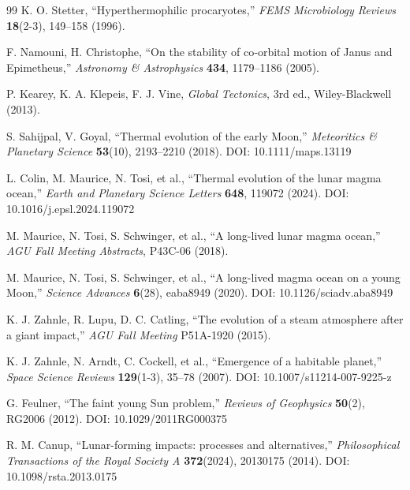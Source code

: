 \documentclass[12pt,a4paper]{article}
\begin{document}
\begin{thebibliography}{99}
		K. O. Stetter, ``Hyperthermophilic procaryotes,''
		\emph{FEMS Microbiology Reviews} \textbf{18}(2-3), 149–158 (1996).
		
		F. Namouni, H. Christophe, ``On the stability of co‑orbital motion of Janus and Epimetheus,''
		\emph{Astronomy \& Astrophysics} \textbf{434}, 1179–1186 (2005).
		
		P. Kearey, K. A. Klepeis, F. J. Vine, \emph{Global Tectonics}, 3rd ed., Wiley-Blackwell (2013).
		
		S. Sahijpal, V. Goyal, ``Thermal evolution of the early Moon,''
		\emph{Meteoritics \& Planetary Science} \textbf{53}(10), 2193–2210 (2018). DOI: 10.1111/maps.13119
		
		L. Colin, M. Maurice, N. Tosi, et al., ``Thermal evolution of the lunar magma ocean,''
		\emph{Earth and Planetary Science Letters} \textbf{648}, 119072 (2024). DOI: 10.1016/j.epsl.2024.119072
		
		M. Maurice, N. Tosi, S. Schwinger, et al., ``A long-lived lunar magma ocean,''
		\emph{AGU Fall Meeting Abstracts}, P43C-06 (2018).
		
		M. Maurice, N. Tosi, S. Schwinger, et al., ``A long-lived magma ocean on a young Moon,''
		\emph{Science Advances} \textbf{6}(28), eaba8949 (2020). DOI: 10.1126/sciadv.aba8949
		
		K. J. Zahnle, R. Lupu, D. C. Catling, ``The evolution of a steam atmosphere after a giant impact,''
		\emph{AGU Fall Meeting} P51A-1920 (2015).
		
		K. J. Zahnle, N. Arndt, C. Cockell, et al., ``Emergence of a habitable planet,''
		\emph{Space Science Reviews} \textbf{129}(1-3), 35–78 (2007). DOI: 10.1007/s11214-007-9225-z
		
		G. Feulner, ``The faint young Sun problem,''
		\emph{Reviews of Geophysics} \textbf{50}(2), RG2006 (2012). DOI: 10.1029/2011RG000375
		
		R. M. Canup, ``Lunar-forming impacts: processes and alternatives,''
		\emph{Philosophical Transactions of the Royal Society A} \textbf{372}(2024), 20130175 (2014). DOI: 10.1098/rsta.2013.0175
		
	\end{thebibliography}
	
\end{document}
